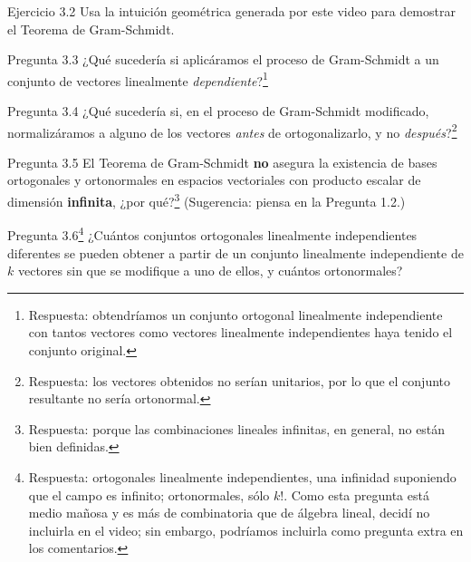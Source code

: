 \documentclass[12pt,dvipsnames]{article}
\numberwithin{equation}{section}
\begin{document}
\vspace{5mm}
Ejercicio 3.2 Usa la intuición geométrica generada por este video para demostrar el Teorema de Gram-Schmidt.

\vspace{5mm}
Pregunta 3.3 ¿Qué sucedería si aplicáramos el proceso de Gram-Schmidt a un conjunto de vectores linealmente \emph{dependiente}?\footnote{Respuesta: obtendríamos un conjunto ortogonal linealmente independiente con tantos vectores como vectores linealmente independientes haya tenido el conjunto original.}

\vspace{5mm}
Pregunta 3.4 ¿Qué sucedería si, en el proceso de Gram-Schmidt modificado, normalizáramos a alguno de los vectores \emph{antes} de ortogonalizarlo, y no \emph{después}?\footnote{Respuesta: los vectores obtenidos no serían unitarios, por lo que el conjunto resultante no sería ortonormal.}

\vspace{5mm}
Pregunta 3.5 El Teorema de Gram-Schmidt \textbf{no} asegura la existencia de bases ortogonales y ortonormales en espacios vectoriales con producto escalar de dimensión \textbf{infinita}, ¿por qué?\footnote{Respuesta: porque las combinaciones lineales infinitas, en general, no están bien definidas.} (Sugerencia: piensa en la Pregunta 1.2.)

Pregunta 3.6\footnote{Respuesta: ortogonales linealmente independientes, una infinidad \textemdash suponiendo que el campo es infinito; ortonormales, sólo $k!$. Como esta pregunta está medio mañosa y es más de combinatoria que de álgebra lineal, decidí no incluirla en el video; sin embargo, podríamos incluirla como pregunta extra en los comentarios.}  ¿Cuántos conjuntos ortogonales linealmente independientes diferentes se pueden obtener a partir de un conjunto linealmente independiente de $k$ vectores \textemdash sin que se modifique a uno de ellos\textemdash , y cuántos ortonormales?
\end{document}
